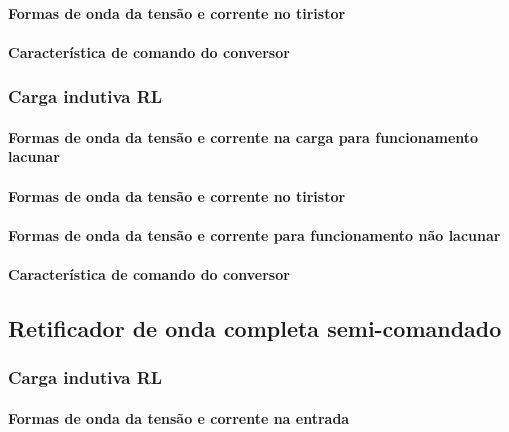 \documentclass[a4paper,11pt]{article}
\numberwithin{equation}{section}
\begin{document}
\paragraph{Formas de onda da tensão e corrente no tiristor}

\paragraph{Característica de comando do conversor}

\subsubsection{Carga indutiva RL}

\paragraph{Formas de onda da tensão e corrente na carga para funcionamento lacunar}



\paragraph{Formas de onda da tensão e corrente no tiristor}

\paragraph{Formas de onda da tensão e corrente para funcionamento não lacunar}

\paragraph{Característica de comando do conversor}

\subsection{Retificador de onda completa semi-comandado}

\subsubsection{Carga indutiva RL}

\paragraph{Formas de onda da tensão e corrente na entrada}
\end{document}
